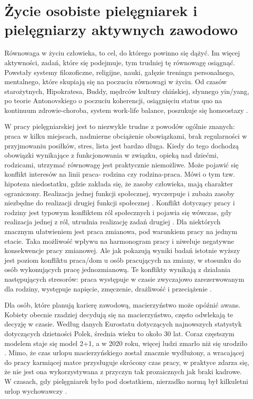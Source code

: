 \documentclass[a4paper,12pt,twoside,openright]{mwrep}
\begin{document}
\section{Życie osobiste pielęgniarek i pielęgniarzy \newline aktywnych zawodowo}
\label{sectionZycieOsobiste}
Równowaga w życiu człowieka, to cel, do którego powinno się dążyć. Im więcej aktywności, zadań, które się podejmuje, tym trudniej tę równowagę osiągnąć. Powstały systemy filozoficzne, religijne, nauki, gałęzie treningu personalnego, mentalnego, które skupiają się na poczuciu równowagi w życiu. Od czasów starożytnych, Hipokratesa, Buddy, mędrców kultury chińskiej, słynnego yin/yang, po teorie Antonovskiego o poczuciu koherencji, osiągnięciu status quo na kontinuum zdrowie-choroba, system work-life balance, poszukuje się homeostazy \cite{salutogeneza}.

W pracy pielęgniarskiej jest to niezwykle trudne z powodów ogólnie znanych: praca w kilku miejscach, nadmierne obciążenie obowiązkami, brak regularności w przyjmowaniu posiłków, stres, lista jest bardzo długa. Kiedy do tego dochodzą obowiązki wynikające z funkcjonowania w związku, opieką nad dziećmi, rodzicami, utrzymać równowagę jest praktycznie niemożliwe. Może pojawić się konflikt interesów na linii praca- rodzina czy rodzina-praca. Mówi o tym tzw. hipoteza niedostatku,  gdzie zakłada się, że zasoby człowieka, mają charakter ograniczony. Realizacja jednej funkcji społecznej, wyczerpuje i zubaża zasoby niezbędne do realizacji drugiej funkcji społecznej \cite{hipoteza}. Konflikt dotyczący pracy i rodziny jest typowym konfliktem ról społecznych i pojawia się wówczas, gdy realizacja jednej z ról, utrudnia realizację zadań drugiej \cite{relacja}. Dla niektórych znacznym ułatwieniem jest praca zmianowa, pod warunkiem pracy na jednym etacie. Taka możliwość wpływu na harmonogram pracy i niweluje negatywne konsekwencje pracy zmianowej. Ale jak pokazują wyniki badań  istotnie wyższy jest poziom konfliktu praca/dom u osób pracujących na zmiany, w stosunku do osób wykonujących pracę jednozmianową. Te konflikty wynikają z działania następujących stresorów: praca występuje w czasie zwyczajowo zarezerwowanym dla rodziny, występuje napięcie, zmęczenie, drażliwość i przeciążenie \cite{konflikt}.
  
Dla osób, które planują karierę zawodową, macierzyństwo może opóźnić awans. Kobiety obecnie rzadziej decydują się na macierzyństwo, często odwlekają te decyzję w czasie. Według danych Eurostatu dotyczących najnowszych statystyk dotyczących dzietności Polek, średnia wieku to około 30 lat. Coraz częstszym modelem staje się model 2+1, a w 2020 roku, więcej ludzi zmarło niż się urodziło \cite{dzieci}. Mimo, że czas urlopu macierzyńskiego został znacznie wydłużony, a wracającej do pracy karmiącej matce przysługuje skrócony czas pracy, w praktyce zdarza się, że nie jest ona wykorzystywana z przyczyn tak prozaicznych jak braki kadrowe. W czasach, gdy pielęgniarek było pod dostatkiem, nierzadko normą był kilkuletni urlop wychowawczy \cite{urlop}.
\end{document}
